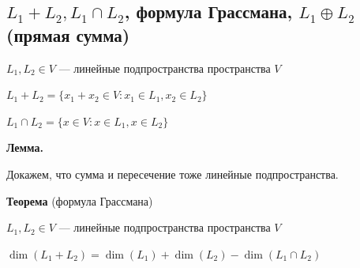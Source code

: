 \documentclass[twoside]{book}
\begin{document}
\subsection{\(L_1 + L_2, L_1 \cap L_2\), формула Грассмана, \(L_1 \oplus L_2\) (прямая сумма)}

\(L_1, L_2 \in V\) --- линейные подпространства пространства \(V\)

\(L_1 + L_2 = \{ x_1 + x_2 \in V : x_1 \in L_1, x_2 \in L_2 \}\)

\(L_1 \cap L_2 = \{ x \in V : x \in L_1, x \in L_2 \}\)

\textbf{Лемма.}

Докажем, что сумма и пересечение тоже линейные подпространства. %

\textbf{Теорема} (формула Грассмана)

\(L_1, L_2 \in V\) --- линейные подпространства пространства \(V\)

\(\dim (L_1 + L_2) = \dim (L_1) + \dim (L_2) - \dim (L_1 \cap L_2)\)
\end{document}
